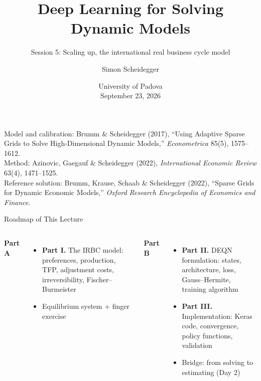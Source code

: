 \documentclass[aspectratio=169,11pt]{beamer}
\title[IRBC -- Padova 2026]%
{Deep Learning for Solving Dynamic Models}
\subtitle{Session 5: Scaling up, the international real business cycle model}
\author{Simon Scheidegger}
\institute[HEC Lausanne]{HEC, University of Lausanne}
\date{University of Padova\\September 23, 2026}
\begin{document}
\newcommand{\exercisepause}{%
  \tikz[baseline=(X.base)]{\node[fill=darkgreen!80!black, text=white,
  rounded corners=2pt, inner sep=3pt, font=\scriptsize\bfseries](X){PAUSE, 5 min};}}



{
\begin{frame}
\titlepage
\vspace{-0.4cm}
\begin{center}
{\footnotesize Model and calibration: Brumm \& Scheidegger (2017), ``Using Adaptive Sparse Grids to Solve High-Dimensional Dynamic Models,'' \emph{Econometrica} 85(5), 1575--1612.\\
Method: Azinovic, Gaegauf \& Scheidegger (2022), \emph{International Economic Review} 63(4), 1471--1525.\\
Reference solution: Brumm, Krause, Schaab \& Scheidegger (2022), ``Sparse Grids for Dynamic Economic Models,'' \emph{Oxford Research Encyclopedia of Economics and Finance}.}
\end{center}
\end{frame}
}

\begin{frame}{Roadmap of This Lecture}
\vspace{0.2em}
\begin{columns}[T]
\textbf{Part A}
\begin{itemize}
    \item \textbf{Part I.} The IRBC model: preferences, production, TFP, adjustment costs, irreversibility, Fischer--Burmeister
    \item Equilibrium system + finger exercise
\end{itemize}

\textbf{Part B}
\begin{itemize}
    \item \textbf{Part II.} DEQN formulation: states, architecture, loss, Gauss--Hermite, training algorithm
    \item \textbf{Part III.} Implementation: Keras code, convergence, policy functions, validation
    \item Bridge: from solving to estimating (Day 2)
\end{itemize}
\end{columns}
\end{frame}
\end{document}
